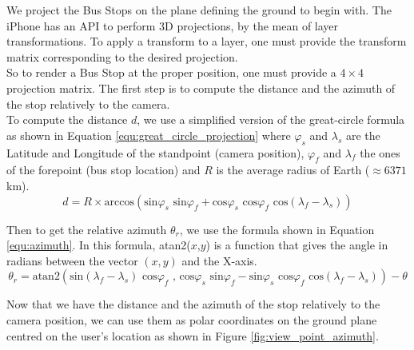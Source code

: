 We project the Bus Stops on the plane defining the ground to begin with. The iPhone has an API to perform 3D projections, by the mean of layer transformations. To apply a transform to a layer, one must provide the transform matrix corresponding to the desired projection.\\

So to render a Bus Stop at the proper position, one must provide a $4\times4$ projection matrix. The first step is to compute the distance and the azimuth of the stop relatively to the camera.\\

To compute the distance $d$, we use a simplified version of the great-circle formula as shown in Equation \ref{equ:great_circle_projection} where $\varphi_s$ and $\lambda_s$ are the Latitude and Longitude of the standpoint (camera position), $\varphi_f$ and $\lambda_f$ the ones of the forepoint (bus stop location) and $R$ is the average radius of Earth ($\approx6371$km).
\begin{equation}
\label{equ:great_circle_projection}
d =  R \times \textrm{arccos}\left(\textrm{sin}\varphi_s \textrm{ sin}\varphi_f + \textrm{cos}\varphi_s \textrm{ cos}\varphi_f \textrm{ cos}(\lambda_f-\lambda_s)\right)
\end{equation}

Then to get the relative azimuth $\theta_r$, we use the formula shown in Equation \ref{equ:azimuth}. In this formula, atan2($x${},{}$y$) is a function that gives the angle in radians between the vector $(x, y)$ and the X-axis.
\begin{equation}
\label{equ:azimuth}
\theta_r = \textrm{atan2}\left(\textrm{sin}( \lambda_f - \lambda_s)\textrm{ cos}\varphi_f\textrm{ , } \textrm{cos}\varphi_s \textrm{ sin}\varphi_f - \textrm{sin}\varphi_s \textrm{ cos}\varphi_f \textrm{ cos}(\lambda_f -\lambda_s)\right) - \theta
\end{equation}

Now that we have the distance and the azimuth of the stop relatively to the camera position, we can use them as polar coordinates on the ground plane centred on the user's location as shown in Figure \ref{fig:view_point_azimuth}.

